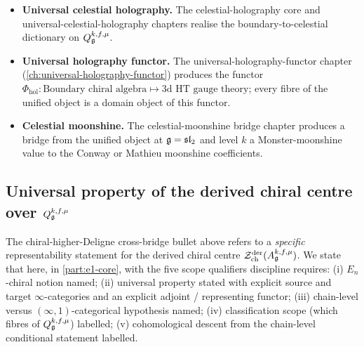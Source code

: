 \begin{itemize}
tower is the $W_N$ hierarchy and the topologisation reaches
$E_{N+1}$; the $W_\infty$ endpoint is an inverse-limit statement under
the chapter's completion hypotheses.
\item \textbf{Universal celestial holography.}
The celestial-holography core and universal-celestial-holography
chapters realise the boundary-to-celestial dictionary on
$Q_{\mathfrak{g}}^{k,f,\mu}$.
\item \textbf{Universal holography functor.}
The universal-holography-functor chapter
(\cref{ch:universal-holography-functor}) produces the functor
$\Phi_{\mathrm{hol}}\colon \text{Boundary chiral algebra}\mapsto
\text{3d HT gauge theory}$; every fibre of the unified object is a
domain object of this functor.
\item \textbf{Celestial moonshine.}
The celestial-moonshine bridge chapter produces a bridge from the
unified object at $\mathfrak{g} = \mathfrak{sl}_2$ and level $k$ a Monster-moonshine
value to the Conway or Mathieu moonshine coefficients.
\end{itemize}

\subsection{Universal property of the derived chiral centre over
$Q_{\mathfrak{g}}^{k,f,\mu}$}
\label{subsec:ucqg-chd-universal-property}

The chiral-higher-Deligne cross-bridge bullet above refers to a
\emph{specific} representability statement for the derived chiral
centre $\mathcal{Z}^{\mathrm{der}}_{\mathrm{ch}}(A_{\mathfrak{g}}^{k,f,\mu})$. We
state that here, in \cref{part:e1-core}, with the five scope
qualifiers discipline requires: (i) $E_n$-chiral notion named;
(ii) universal property stated with explicit source and
target $\infty$-categories and an explicit adjoint / representing
functor; (iii) chain-level versus $(\infty,1)$-categorical
hypothesis named; (iv) classification scope (which fibres of
$Q_{\mathfrak{g}}^{k,f,\mu}$) labelled; (v) cohomological descent from the
chain-level conditional statement labelled.

